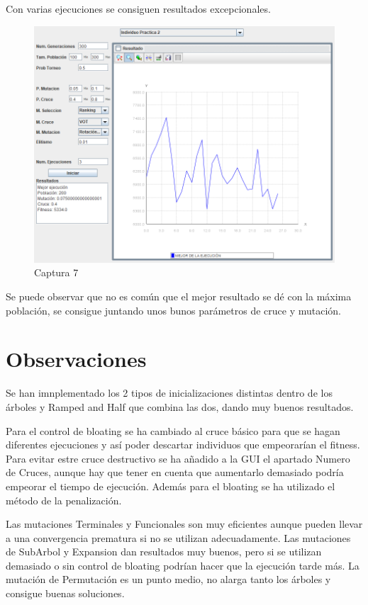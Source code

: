 \documentclass[twoside]{AiTeX}
\begin{document}
Con varias ejecuciones se consiguen resultados excepcionales.

\begin{figure}[H]
    \centering
    \includegraphics[width = \textwidth]{Images/Captura7.png}
    \caption{Captura 7}
    \label{fig:7}
\end{figure}

Se puede observar que no es común que el mejor resultado se dé con la máxima población, se consigue juntando unos bunos parámetros de cruce y mutación.


\section{Observaciones}

Se han imnplementado los 2 tipos de inicializaciones distintas dentro de los árboles y Ramped and Half que combina las dos, dando muy buenos resultados.

Para el control de bloating se ha cambiado al cruce básico para que se hagan diferentes ejecuciones y así poder descartar individuos que empeorarían el fitness. Para evitar estre cruce destructivo se ha añadido a la GUI el apartado Numero de Cruces, aunque hay que tener en cuenta que aumentarlo demasiado podría empeorar el tiempo de ejecución.
Además para el bloating se ha utilizado el método de la penalización.

Las mutaciones Terminales y Funcionales son muy eficientes aunque pueden llevar a una convergencia prematura si no se utilizan adecuadamente.
Las mutaciones de SubArbol y Expansion dan resultados muy buenos, pero si se utilizan demasiado o sin control de bloating podrían hacer que la ejecución tarde más.
La mutación de Permutación es un punto medio, no alarga tanto los árboles y consigue buenas soluciones.
\end{document}
